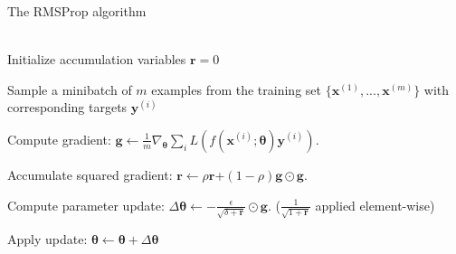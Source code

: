 \begin{algorithm}
\caption{The RMSProp algorithm}\label{alg:RMSProp}
\begin{algorithmic}
    
    \\
    Initialize accumulation variables $\boldsymbol{r}=0$
    

        Sample a minibatch of $m$ examples from the training set
        $\{\boldsymbol{x}^{(1)}, ..., \boldsymbol{x}^{(m)}\}$ with corresponding
        targets $\boldsymbol{y}^{(i)}$
    
        Compute gradient: $\boldsymbol{g} \gets
        \frac{1}{m}\nabla_{\boldsymbol\theta}
        \sum_{i}L(f(\boldsymbol{x}^{(i)};\boldsymbol{\theta})\boldsymbol{y}^{(i)})$.
        
        Accumulate squared gradient: $\boldsymbol{r} \gets
        \rho\boldsymbol{r}$+$(1-\rho)\boldsymbol{g}\odot\boldsymbol{g}$.

        Compute parameter update: 
        $\Delta\boldsymbol{\theta}\gets -\frac{\epsilon}{\sqrt{\delta+\boldsymbol{r}}}
        \odot\boldsymbol{g}$. ($\frac{1}{\sqrt{1+\boldsymbol{r}}}$ applied
        element-wise)
    
        Apply update: $\boldsymbol{\theta}\gets
        \boldsymbol\theta+\Delta\boldsymbol\theta$
    \EndWhile

\end{algorithmic}
\end{algorithm}


